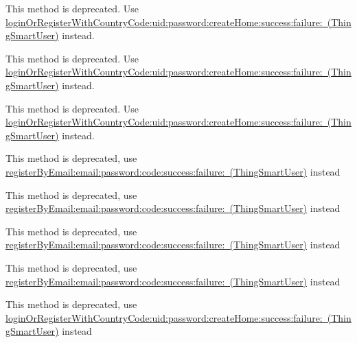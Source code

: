 \begin{DoxyRefList}
\label{deprecated__deprecated000237}%
%
This method is deprecated. Use \mbox{\hyperlink{interface_thing_smart_user_a2e848d4067bc3e9aed5a7db187ceecd6}{login\+Or\+Register\+With\+Country\+Code\+:uid\+:password\+:create\+Home\+:success\+:failure\+: (\+Thing\+Smart\+User)}} instead. 

\label{deprecated__deprecated000217}%
%
This method is deprecated. Use \mbox{\hyperlink{interface_thing_smart_user_a2e848d4067bc3e9aed5a7db187ceecd6}{login\+Or\+Register\+With\+Country\+Code\+:uid\+:password\+:create\+Home\+:success\+:failure\+: (\+Thing\+Smart\+User)}} instead. 

\label{deprecated__deprecated000207}%
%
This method is deprecated. Use \mbox{\hyperlink{interface_thing_smart_user_a2e848d4067bc3e9aed5a7db187ceecd6}{login\+Or\+Register\+With\+Country\+Code\+:uid\+:password\+:create\+Home\+:success\+:failure\+: (\+Thing\+Smart\+User)}} instead.  
\item[(Deprecated\+Api) Member \mbox{\hyperlink{category_thing_smart_user_07_deprecated_api_08_af6ec5053850acde2e2fbcc0bf9e06244}{\mbox{[}Thing\+Smart\+User(Deprecated\+Api) register\+By\+Email\+:email\+:password\+:success\+:failure\+:\mbox{]}}} ]\label{deprecated__deprecated000211}%
%
This method is deprecated, use \mbox{\hyperlink{interface_thing_smart_user_ab4734646c72755eaf220d874bc060e4e}{register\+By\+Email\+:email\+:password\+:code\+:success\+:failure\+: (\+Thing\+Smart\+User)}} instead 

\label{deprecated__deprecated000231}%
%
This method is deprecated, use \mbox{\hyperlink{interface_thing_smart_user_ab4734646c72755eaf220d874bc060e4e}{register\+By\+Email\+:email\+:password\+:code\+:success\+:failure\+: (\+Thing\+Smart\+User)}} instead 

\label{deprecated__deprecated000201}%
%
This method is deprecated, use \mbox{\hyperlink{interface_thing_smart_user_ab4734646c72755eaf220d874bc060e4e}{register\+By\+Email\+:email\+:password\+:code\+:success\+:failure\+: (\+Thing\+Smart\+User)}} instead 

\label{deprecated__deprecated000221}%
%
This method is deprecated, use \mbox{\hyperlink{interface_thing_smart_user_ab4734646c72755eaf220d874bc060e4e}{register\+By\+Email\+:email\+:password\+:code\+:success\+:failure\+: (\+Thing\+Smart\+User)}} instead  
\item[(Deprecated\+Api) Member \mbox{\hyperlink{category_thing_smart_user_07_deprecated_api_08_a78ee1534cc8a9d0775f3711ff9c38d93}{\mbox{[}Thing\+Smart\+User(Deprecated\+Api) register\+By\+Uid\+:password\+:country\+Code\+:success\+:failure\+:\mbox{]}}} ]\label{deprecated__deprecated000215}%
%
This method is deprecated, use \mbox{\hyperlink{interface_thing_smart_user_a2e848d4067bc3e9aed5a7db187ceecd6}{login\+Or\+Register\+With\+Country\+Code\+:uid\+:password\+:create\+Home\+:success\+:failure\+: (\+Thing\+Smart\+User)}} instead 


\end{DoxyRefList}
